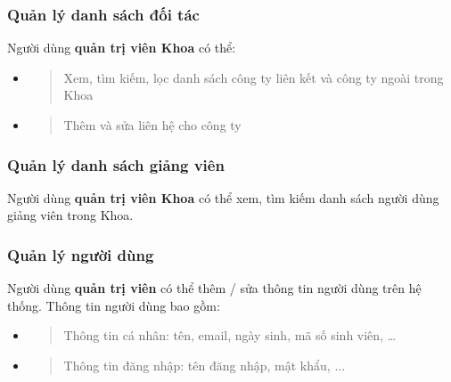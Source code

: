 \documentclass[./../main.tex]{subfiles}
\begin{document}
  \hypertarget{quux1ea3n-luxfd-danh-suxe1ch-ux111ux1ed1i-tuxe1c}{%
  \subsubsection{Quản lý danh sách đối
  tác}\label{quux1ea3n-luxfd-danh-suxe1ch-ux111ux1ed1i-tuxe1c}}
  
  Người dùng \textbf{quản trị viên Khoa} có thể:
  
  \begin{itemize}
  \item
    \begin{quote}
    Xem, tìm kiếm, lọc danh sách công ty liên kết và công ty ngoài trong
    Khoa
    \end{quote}
  \item
    \begin{quote}
    Thêm và sửa liên hệ cho công ty
    \end{quote}
  \end{itemize}
  
  \hypertarget{quux1ea3n-luxfd-danh-suxe1ch-giux1ea3ng-viuxean}{%
  \subsubsection{Quản lý danh sách giảng
  viên}\label{quux1ea3n-luxfd-danh-suxe1ch-giux1ea3ng-viuxean}}
  
  Người dùng \textbf{quản trị viên Khoa} có thể xem, tìm kiếm danh sách
  người dùng giảng viên trong Khoa.
  
  \hypertarget{quux1ea3n-luxfd-ngux1b0ux1eddi-duxf9ng}{%
  \subsubsection{Quản lý người
  dùng}\label{quux1ea3n-luxfd-ngux1b0ux1eddi-duxf9ng}}
  
  Người dùng \textbf{quản trị viên} có thể thêm / sửa thông tin người dùng
  trên hệ thống. Thông tin người dùng bao gồm:
  
  \begin{itemize}
  \item
    \begin{quote}
    Thông tin cá nhân: tên, email, ngày sinh, mã số sinh viên, \ldots{}
    \end{quote}
  \item
    \begin{quote}
    Thông tin đăng nhập: tên đăng nhập, mật khẩu, ...
    \end{quote}
  \end{itemize}
  
\end{document}
